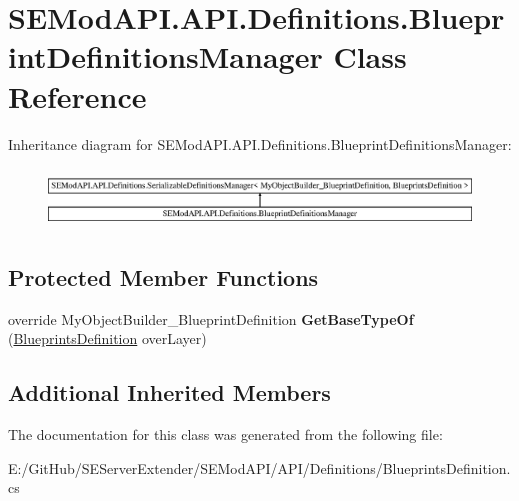 \hypertarget{class_s_e_mod_a_p_i_1_1_a_p_i_1_1_definitions_1_1_blueprint_definitions_manager}{}\section{S\+E\+Mod\+A\+P\+I.\+A\+P\+I.\+Definitions.\+Blueprint\+Definitions\+Manager Class Reference}
\label{class_s_e_mod_a_p_i_1_1_a_p_i_1_1_definitions_1_1_blueprint_definitions_manager}
Inheritance diagram for S\+E\+Mod\+A\+P\+I.\+A\+P\+I.\+Definitions.\+Blueprint\+Definitions\+Manager\+:\begin{figure}[H]
\begin{center}
\leavevmode
\includegraphics[height=1.611511cm]{class_s_e_mod_a_p_i_1_1_a_p_i_1_1_definitions_1_1_blueprint_definitions_manager}
\end{center}
\end{figure}
\subsection*{Protected Member Functions}
\begin{DoxyCompactItemize}
\item 
\hypertarget{class_s_e_mod_a_p_i_1_1_a_p_i_1_1_definitions_1_1_blueprint_definitions_manager_ada3ac3c89a20e1ea849b5d34fd347fbd}{}override My\+Object\+Builder\+\_\+\+Blueprint\+Definition {\bfseries Get\+Base\+Type\+Of} (\hyperlink{class_s_e_mod_a_p_i_1_1_a_p_i_1_1_definitions_1_1_blueprints_definition}{Blueprints\+Definition} over\+Layer)\label{class_s_e_mod_a_p_i_1_1_a_p_i_1_1_definitions_1_1_blueprint_definitions_manager_ada3ac3c89a20e1ea849b5d34fd347fbd}

\end{DoxyCompactItemize}
\subsection*{Additional Inherited Members}


The documentation for this class was generated from the following file\+:\begin{DoxyCompactItemize}
\item 
E\+:/\+Git\+Hub/\+S\+E\+Server\+Extender/\+S\+E\+Mod\+A\+P\+I/\+A\+P\+I/\+Definitions/Blueprints\+Definition.\+cs\end{DoxyCompactItemize}
